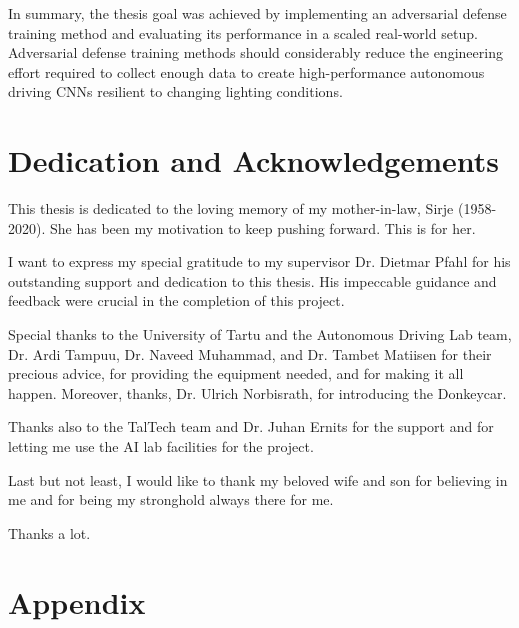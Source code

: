 \documentclass[12pt]{article}
\renewcommand{\appendixname}{Lisad}%
\begin{document}
In summary, the thesis goal was achieved by implementing an adversarial defense training method and evaluating its performance in a scaled real-world setup. Adversarial defense training methods should considerably reduce the engineering effort required to collect enough data to create high-performance autonomous driving CNNs resilient to changing lighting conditions.

\clearpage

\section{Dedication and Acknowledgements}

This thesis is dedicated to the loving memory of my mother-in-law, Sirje (1958-2020). She has been my motivation to keep pushing forward. This is for her.

I want to express my special gratitude to my supervisor Dr. Dietmar Pfahl for his outstanding support and dedication to this thesis. His impeccable guidance and feedback were crucial in the completion of this project. 

Special thanks to the University of Tartu and the Autonomous Driving Lab team, Dr. Ardi Tampuu, Dr. Naveed Muhammad, and Dr. Tambet Matiisen for their precious advice, for providing the equipment needed, and for making it all happen. Moreover, thanks, Dr. Ulrich Norbisrath, for introducing the Donkeycar. 

Thanks also to the TalTech team and Dr. Juhan Ernits for the support and for letting me use the AI lab facilities for the project.

Last but not least, I would like to thank my beloved wife and son for believing in me and for being my stronghold always there for me.

Thanks a lot.

\clearpage

\newpage

% 
\printbibliography

\newpage
%
  {\section*{Appendix}
  }%
  
\end{document}
